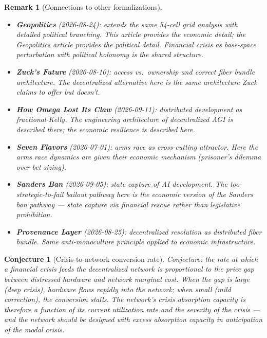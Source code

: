 \documentclass[11pt,a4paper]{article}
\newtheorem{conjecture}[definition]{Conjecture}
\newtheorem{remark}[definition]{Remark}
\begin{document}
\begin{remark}[Connections to other formalizations]
\begin{itemize}
\item \textbf{Geopolitics} (2026-08-24): extends the same 54-cell grid
  analysis with detailed political branching. This article provides the
  economic detail; the Geopolitics article provides the political detail.
  Financial crisis as base-space perturbation with political holonomy
  is the shared structure.
\item \textbf{Zuck's Future} (2026-08-10): access vs.\ ownership and
  correct fiber bundle architecture. The decentralized alternative here
  is the same architecture Zuck claims to offer but doesn't.
\item \textbf{How Omega Lost Its Claw} (2026-09-11): distributed
  development as fractional-Kelly. The engineering architecture of
  decentralized AGI is described there; the economic resilience is
  described here.
\item \textbf{Seven Flavors} (2026-07-01): arms race as cross-cutting
  attractor. Here the arms race dynamics are given their economic
  mechanism (prisoner's dilemma over bet sizing).
\item \textbf{Sanders Ban} (2026-09-05): state capture of AI development.
  The too-strategic-to-fail bailout pathway here is the economic version
  of the Sanders ban pathway --- state capture via financial rescue
  rather than legislative prohibition.
\item \textbf{Provenance Layer} (2026-08-25): decentralized resolution
  as distributed fiber bundle. Same anti-monoculture principle applied
  to economic infrastructure.
\end{itemize}
\end{remark}

\begin{conjecture}[Crisis-to-network conversion rate]
Conjecture: the rate at which a financial crisis feeds the decentralized
network is proportional to the price gap between distressed hardware and
network marginal cost. When the gap is large (deep crisis), hardware
flows rapidly into the network; when small (mild correction), the
conversion stalls. The network's crisis absorption capacity is therefore
a function of its current utilization rate and the severity of the crisis
--- and the network should be designed with excess absorption capacity
in anticipation of the modal crisis.
\end{conjecture}
\end{document}
